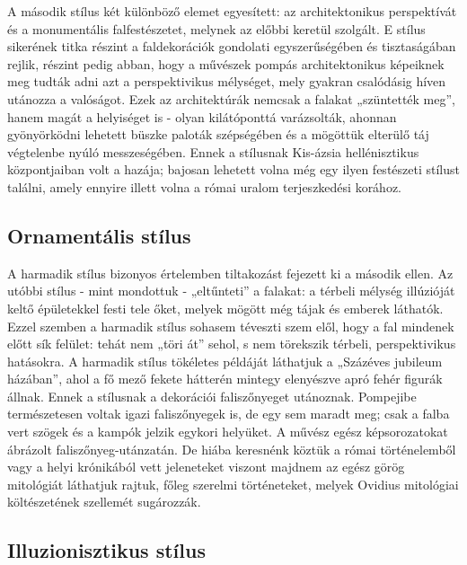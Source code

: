 	
	A második stílus két különböző elemet egyesített: az architektonikus perspektívát és a
	monumentális falfestészetet, melynek az előbbi keretül szolgált. E stílus sikerének titka
	részint a faldekorációk gondolati egyszerűségében és tisztaságában rejlik, részint pedig
	abban, hogy a művészek pompás architektonikus képeiknek meg tudták adni azt a 
	perspektivikus mélységet, mely gyakran csalódásig híven utánozza a valóságot. Ezek az
	architektúrák nemcsak a falakat „szüntették meg”, hanem magát a helyiséget is - olyan
	kilátóponttá varázsolták, ahonnan gyönyörködni lehetett büszke paloták szépségében és a
	mögöttük elterülő táj végtelenbe nyúló messzeségében. Ennek a stílusnak Kis-ázsia
	hellénisztikus központjaiban volt a hazája; bajosan lehetett volna még egy ilyen festészeti
	stílust találni, amely ennyire illett volna a római uralom terjeszkedési korához.
	
	\subsection{Ornamentális stílus}
	
	A harmadik stílus bizonyos értelemben tiltakozást fejezett ki a második ellen. Az utóbbi
	stílus - mint mondottuk - „eltűnteti” a falakat: a térbeli mélység illúzióját keltő
	épületekkel festi tele őket, melyek mögött még tájak és emberek láthatók. Ezzel szemben
	a harmadik stílus sohasem téveszti szem elől, hogy a fal mindenek előtt sík felület: tehát
	nem „töri át” sehol, s nem törekszik térbeli, perspektivikus hatásokra. A harmadik stílus
	tökéletes példáját láthatjuk a „Százéves jubileum házában”, ahol a fő mező fekete
	hátterén mintegy elenyészve apró fehér figurák állnak. Ennek a stílusnak a dekorációi
	faliszőnyeget utánoznak.
	Pompejibe természetesen voltak igazi faliszőnyegek is, de egy sem maradt meg; csak a
	falba vert szögek és a kampók jelzik egykori helyüket. A művész egész képsorozatokat
	ábrázolt faliszőnyeg-utánzatán. De hiába keresnénk köztük a római történelemből vagy a
	helyi krónikából vett jeleneteket viszont majdnem az egész görög mitológiát láthatjuk
	rajtuk, főleg szerelmi történeteket, melyek Ovidius mitológiai költészetének szellemét
	sugározzák. 
	
	\subsection{ Illuzionisztikus stílus}
	
